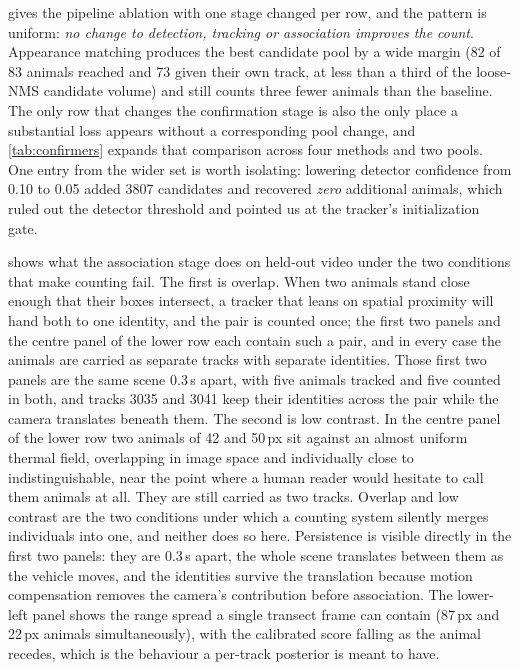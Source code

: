  gives the pipeline ablation with one stage changed per row, and the
pattern is uniform: \emph{no change to detection, tracking or association improves the count}.
Appearance matching produces the best candidate pool by a wide margin (82 of 83 animals reached and 73 given their own track, at less than a third of the loose-NMS candidate volume) and still counts three fewer animals than the baseline. The only row that changes
the confirmation stage is also the only place a substantial loss appears without a
corresponding pool change, and \cref{tab:confirmers} expands that comparison across four
methods and two pools. One entry from the wider set is worth isolating: lowering detector confidence from 0.10 to 0.05 added
3807 candidates and recovered \emph{zero} additional animals, which ruled out the detector
threshold and pointed us at the tracker's initialization gate.

 shows what the association stage does on held-out video under the two
conditions that make counting fail. The first is overlap. When two animals stand close
enough that their boxes intersect, a tracker that leans on spatial proximity will hand both
to one identity, and the pair is counted once; the first two panels and the centre panel of
the lower row each contain such a pair, and in every case the animals are carried as separate
tracks with separate identities. Those first two panels are the same scene 0.3\,s apart, with
five animals tracked and five counted in both, and tracks 3035 and 3041 keep their identities
across the pair while the camera translates beneath them. The second is low contrast. In the centre panel of the lower row two animals of 42 and 50\,px sit
against an almost uniform thermal field, overlapping in image space and individually close to indistinguishable, near the point where a human reader would hesitate to call them animals at all. They are still carried as two tracks. Overlap and low contrast are the two
conditions under which a counting system silently merges individuals into one, and neither
does so here. Persistence
is visible directly in the first two panels: they are 0.3\,s apart, the whole scene
translates between them as the vehicle moves, and the identities survive the translation
because motion compensation removes the camera's contribution before association. The
lower-left panel shows the range spread a single transect frame can contain (87\,px and 22\,px animals simultaneously), with the calibrated score falling as the animal recedes,
which is the behaviour a per-track posterior is meant to have.

